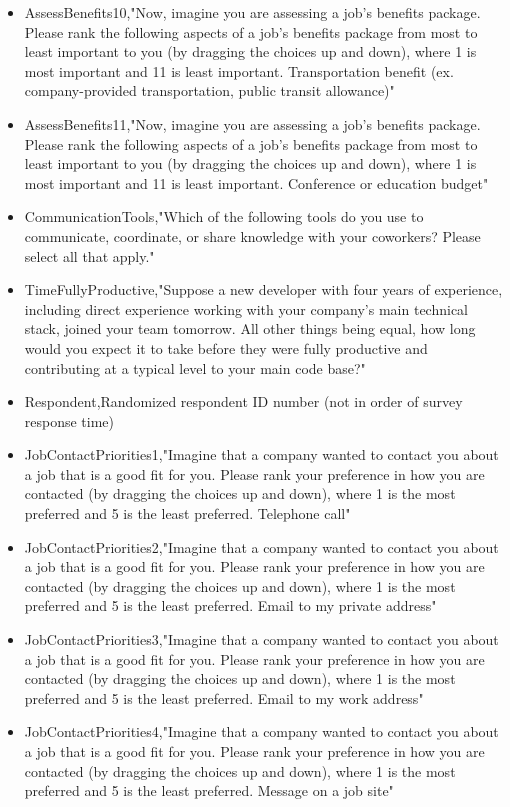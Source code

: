 \begin{appendices}
\begin{itemize}
        \item AssessBenefits10,"Now, imagine you are assessing a job's benefits package. Please rank the following aspects of a job's benefits package from most to least important to you (by dragging the choices up and down), where 1 is most important and 11 is least important. Transportation benefit (ex. company-provided transportation, public transit allowance)"
        \item AssessBenefits11,"Now, imagine you are assessing a job's benefits package. Please rank the following aspects of a job's benefits package from most to least important to you (by dragging the choices up and down), where 1 is most important and 11 is least important. Conference or education budget"
        \item CommunicationTools,"Which of the following tools do you use to communicate, coordinate, or share knowledge with your coworkers? Please select all that apply."
        \item TimeFullyProductive,"Suppose a new developer with four years of experience, including direct experience working with your company's main technical stack, joined your team tomorrow. All other things being equal, how long would you expect it to take before they were fully productive and contributing at a typical level to your main code base?"
        \item Respondent,Randomized respondent ID number (not in order of survey response time)
        \item JobContactPriorities1,"Imagine that a company wanted to contact you about a job that is a good fit for you. Please rank your preference in how you are contacted (by dragging the choices up and down), where 1 is the most preferred and 5 is the least preferred. Telephone call"
        \item JobContactPriorities2,"Imagine that a company wanted to contact you about a job that is a good fit for you. Please rank your preference in how you are contacted (by dragging the choices up and down), where 1 is the most preferred and 5 is the least preferred. Email to my private address"
        \item JobContactPriorities3,"Imagine that a company wanted to contact you about a job that is a good fit for you. Please rank your preference in how you are contacted (by dragging the choices up and down), where 1 is the most preferred and 5 is the least preferred. Email to my work address"
        \item JobContactPriorities4,"Imagine that a company wanted to contact you about a job that is a good fit for you. Please rank your preference in how you are contacted (by dragging the choices up and down), where 1 is the most preferred and 5 is the least preferred. Message on a job site"

\end{itemize}
\end{appendices}
